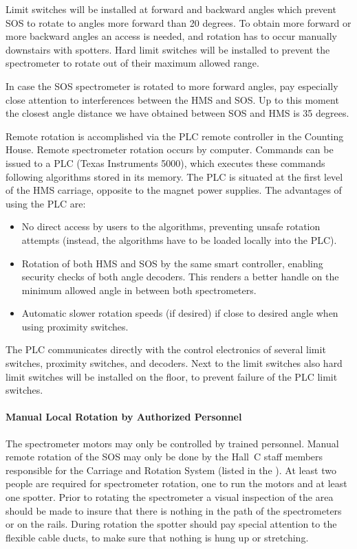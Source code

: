 Limit switches will be installed at forward
and backward angles which prevent SOS to rotate to angles more forward than
20 degrees. To obtain more forward or more
backward angles an access is needed, and rotation has to occur manually
downstairs with spotters. Hard limit switches will be installed to prevent
the spectrometer to rotate out of their maximum allowed range.

In case the SOS spectrometer is rotated to more forward angles, pay especially
close attention to interferences between the HMS and SOS. Up to this moment the closest angle
distance we have obtained between SOS and HMS is 35 degrees.

Remote rotation  is accomplished via the PLC remote controller in the Counting House. 
Remote spectrometer rotation occurs by computer. Commands can be
issued to a PLC (Texas Instruments 5000), which executes these commands
following algorithms stored in its memory. The PLC is situated at the first
level of the HMS carriage, opposite to the magnet power supplies.
The advantages of using the PLC are:

\begin{itemize}
\item{No direct access by users to the algorithms, preventing unsafe
rotation attempts (instead, the algorithms have to be loaded locally into
the PLC).}
\item{Rotation of both HMS and SOS by the same smart controller, enabling
security checks of both angle decoders. This renders a better handle on the
minimum allowed angle in between both spectrometers.}
\item{Automatic slower rotation speeds (if desired) if close to desired angle
when using proximity switches.}
\end{itemize}

The PLC communicates directly with the control electronics of several limit
switches, proximity switches, and decoders. Next to the limit switches
also hard limit switches will be installed on the floor, to prevent failure
of the PLC limit switches.


\paragraph{Manual Local Rotation by Authorized Personnel}

The spectrometer motors may only be controlled by trained personnel.
Manual remote rotation of the SOS may only be done by the 
Hall~C staff members responsible for the Carriage and Rotation
System (listed in the 
).  
At least two people are required for spectrometer rotation, one to
run the motors and at least one spotter. Prior to rotating the spectrometer
a visual inspection of the area should be made to insure that there
is nothing in the path of the spectrometers or on the rails. During rotation
the spotter should pay special attention to the flexible cable ducts,
to make sure that nothing is hung up or stretching.


